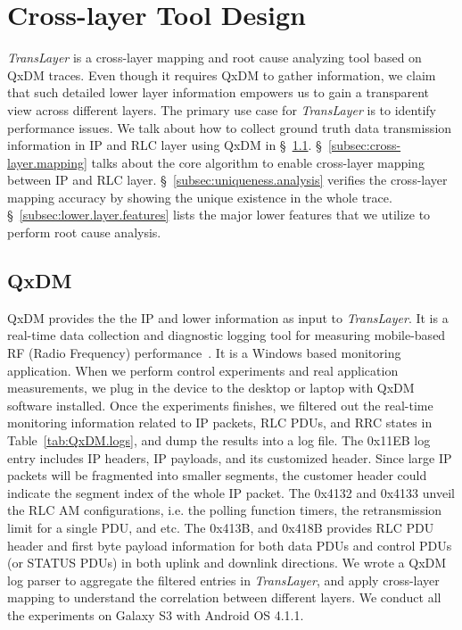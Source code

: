 \section{Cross-layer Tool Design}
\label{sec:crossAnalysis}

\textit{TransLayer} is a cross-layer mapping and root cause analyzing tool based on QxDM traces. Even though it requires QxDM to gather information, we claim that such detailed lower layer information empowers us to gain a transparent view across different layers. The primary use case for \textit{TransLayer} is to identify performance issues. We talk about how to collect ground truth data transmission information in IP and RLC layer using QxDM in \S~\ref{subsec:qxdm.tool}. \S~\ref{subsec:cross-layer.mapping} talks about the core algorithm to enable cross-layer mapping between IP and RLC layer. \S~\ref{subsec:uniqueness.analysis} verifies the cross-layer mapping accuracy by showing the unique existence in the whole trace. \S~\ref{subsec:lower.layer.features} lists the major lower features that we utilize to perform root cause analysis.

\subsection{QxDM}
\label{subsec:qxdm.tool}
QxDM provides the the IP and lower information as input to \textit{TransLayer}. It is a real-time data collection and diagnostic logging tool for measuring mobile-based RF (Radio Frequency) performance~\cite{qxdm_flyer}. It is a Windows based monitoring application. When we perform control experiments and real application measurements, we plug in the device to the desktop or laptop with QxDM software installed. Once the experiments finishes, we filtered out the real-time monitoring information related to IP packets, RLC PDUs, and RRC states in Table~\ref{tab:QxDM.logs}, and dump the results into a log file. The 0x11EB log entry includes IP headers, IP payloads, and its customized header. Since large IP packets will be fragmented into smaller segments, the customer header could indicate the segment index of the whole IP packet. The 0x4132 and 0x4133 unveil the RLC AM configurations, i.e. the polling function timers, the retransmission limit for a single PDU, and etc. The 0x413B, and 0x418B provides RLC PDU header and first byte payload information for both data PDUs and control PDUs (or STATUS PDUs) in both uplink and downlink directions. We wrote a QxDM log parser to aggregate the filtered entries in \textit{TransLayer}, and apply cross-layer mapping to understand the correlation between different layers. We conduct all the experiments on Galaxy S3 with Android OS 4.1.1.

